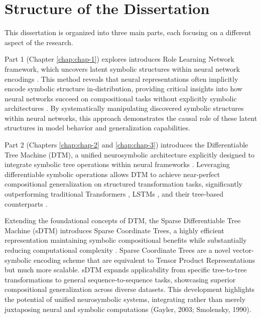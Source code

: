 
\section{Structure of the Dissertation}
This dissertation is organized into three main parts, each focusing on a different aspect of the research. 

Part 1 (Chapter \ref{chap:chap-1}) explores introduces Role Learning Network framework, which uncovers latent symbolic structures within neural network encodings \citep{soulos2020discovering}. This method reveals that neural representations often implicitly encode symbolic structure in-distribution, providing critical insights into how neural networks succeed on compositional tasks without explicitly symbolic architectures \citep{mccoy2018rnns}. By systematically manipulating discovered symbolic structures within neural networks, this approach demonstrates the causal role of these latent structures in model behavior and generalization capabilities. 

Part 2 (Chapters \ref{chap:chap-2} and \ref{chap:chap-3}) introduces the Differentiable Tree Machine (DTM), a unified neurosymbolic architecture explicitly designed to integrate symbolic tree operations within neural frameworks \citep{pmlr-v202-soulos23a,soulos2024compositional}. Leveraging differentiable symbolic operations allows DTM to achieve near-perfect compositional generalization on structured transformation tasks, significantly outperforming traditional Transformers \citep{vaswani2017attention}, LSTMs \citep{hochreiter_long_1997}, and their tree-based counterparts \citep{tai2015improved,dong2016language,NEURIPS2018_d759175d,shiv_novel_2019}.

Extending the foundational concepts of DTM, the Sparse Differentiable Tree Machine (sDTM) introduces Sparse Coordinate Trees, a highly efficient representation maintaining symbolic compositional benefits while substantially reducing computational complexity \citep{soulos2024compositional}. Sparse Coordinate Trees are a novel vector-symbolic encoding scheme that are equivalent to Tensor Product Representations but much more scalable. sDTM expands applicability from specific tree-to-tree transformations to general sequence-to-sequence tasks, showcasing superior compositional generalization across diverse datasets. This development highlights the potential of unified neurosymbolic systems, integrating rather than merely juxtaposing neural and symbolic computations (Gayler, 2003; Smolensky, 1990).


